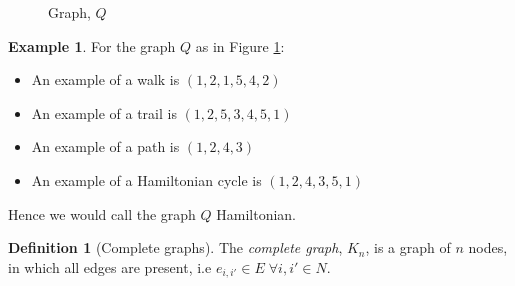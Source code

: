 \documentclass[a4paper,10pt]{article}
\theoremstyle{definition}
\newtheorem{definition}[theorem]{Definition}
\theoremstyle{definition}
\newtheorem{example}[theorem]{Example}
\theoremstyle{remark}
\theoremstyle{definition}
\begin{document}
\begin{figure}
\begin{center}
\end{center}
\caption{Graph, $Q$}
\label{figure: walks on graph Q}
\end{figure}

\begin{example}
For the graph $Q$ as in Figure \ref{figure: walks on graph Q}:
\begin{itemize}
\item An example of a walk is $(1,2,1,5,4,2)$
\item An example of a trail is $(1,2,5,3,4,5,1)$
\item An example of a path is $(1,2,4,3)$
\item An example of a Hamiltonian cycle is $(1,2,4,3,5,1)$
\end{itemize}
Hence we would call the graph $Q$ Hamiltonian.
\end{example}

\begin{definition}[Complete graphs]
The \textit{complete graph}, $K_{n}$, is a graph of $n$ nodes, in which all edges are present, i.e $e_{i,i'} \in E \; \forall i,i' \in N$.
\end{definition}
\end{document}
